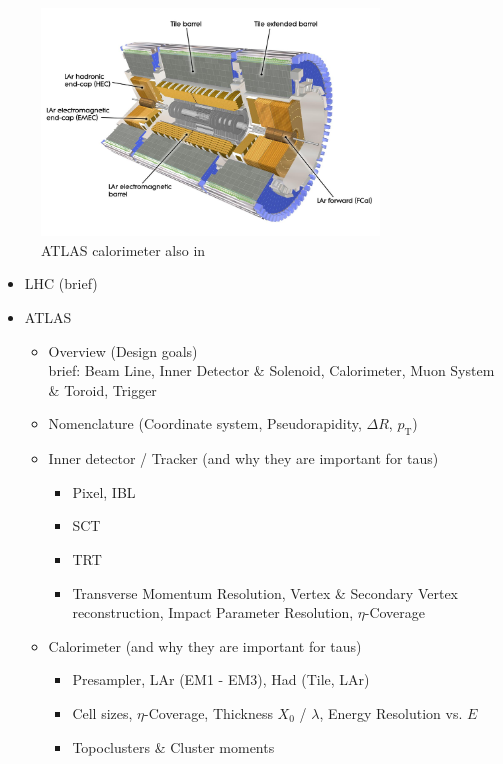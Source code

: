 \begin{figure}[ht]
  \centering
  \includegraphics[width=0.8\textwidth]{./figures/atlas/calorimeter.jpg}
  \caption{ATLAS calorimeter\cite{calo_fig} also in \cite{atlas_detector}}
  \label{fig:atlas_indet}
\end{figure}



\begin{itemize}
\item LHC (brief)

\item ATLAS
  \begin{itemize}
  \item Overview (Design goals) \\
    brief: Beam Line, Inner Detector \& Solenoid, Calorimeter, Muon System \&
    Toroid, Trigger

  \item Nomenclature (Coordinate system, Pseudorapidity, $\Delta R$,
    $p_\mathrm{T}$)

  \item Inner detector / Tracker (and why they are important for taus)
    \begin{itemize}
    \item Pixel, IBL
    \item SCT
    \item TRT
    \item  Transverse Momentum Resolution, Vertex \& Secondary Vertex
      reconstruction, Impact Parameter Resolution, $\eta$-Coverage
    \end{itemize}

  \item Calorimeter (and why they are important for taus)
    \begin{itemize}
    \item Presampler, LAr (EM1 - EM3), Had (Tile, LAr)
    \item Cell sizes, $\eta$-Coverage, Thickness $X_0$ / $\lambda$,
      Energy Resolution vs. $E$
    \item Topoclusters \& Cluster moments
    \end{itemize}

  \end{itemize}
\end{itemize}

